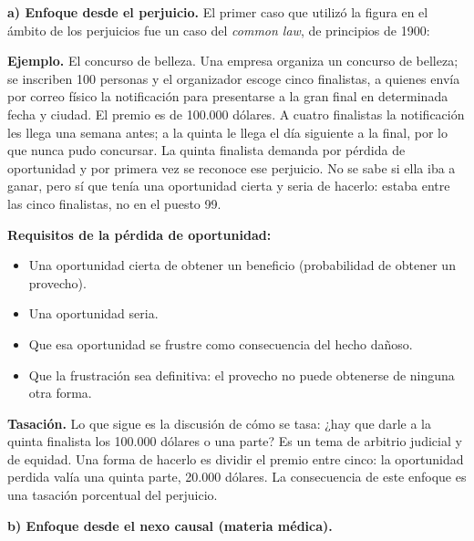 \textbf{a) Enfoque desde el perjuicio.} El primer caso que utilizó la figura en el ámbito de los perjuicios fue un caso del \textit{common law}, de principios de 1900:

\begin{ejemplo}
\textcolor[HTML]{4F6228}{\textbf{Ejemplo. }}El concurso de belleza. Una empresa organiza un concurso de belleza; se inscriben 100 personas y el organizador escoge cinco finalistas, a quienes envía por correo físico la notificación para presentarse a la gran final en determinada fecha y ciudad. El premio es de 100.000 dólares. A cuatro finalistas la notificación les llega una semana antes; a la quinta le llega el día siguiente a la final, por lo que nunca pudo concursar. La quinta finalista demanda por pérdida de oportunidad y por primera vez se reconoce ese perjuicio. No se sabe si ella iba a ganar, pero sí que tenía una oportunidad cierta y seria de hacerlo: estaba entre las cinco finalistas, no en el puesto 99.
\end{ejemplo}
\textbf{Requisitos de la pérdida de oportunidad:}

\begin{itemize}
\item Una oportunidad cierta de obtener un beneficio (probabilidad de obtener un provecho).
\item Una oportunidad seria.
\item Que esa oportunidad se frustre como consecuencia del hecho dañoso.
\item Que la frustración sea definitiva: el provecho no puede obtenerse de ninguna otra forma.
\end{itemize}
\textbf{Tasación.} Lo que sigue es la discusión de cómo se tasa: ¿hay que darle a la quinta finalista los 100.000 dólares o una parte? Es un tema de arbitrio judicial y de equidad. Una forma de hacerlo es dividir el premio entre cinco: la oportunidad perdida valía una quinta parte, 20.000 dólares. La consecuencia de este enfoque es una tasación porcentual del perjuicio.

\textbf{b) Enfoque desde el nexo causal (materia médica).}

